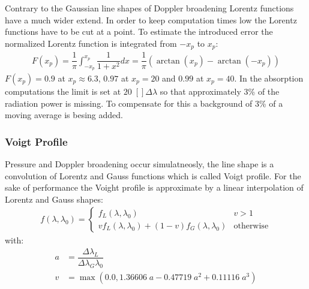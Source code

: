 Contrary to the Gaussian line shapes of Doppler broadening Lorentz functions have a much wider extend. In order to keep computation times low the Lorentz functions have to be cut at a point. To estimate the introduced error the normalized Lorentz function is integrated from $-x_p$ to $x_p$:
\begin{align}
	F(x_p) = \dfrac{1}{\pi} \int_{-x_p}^{x_p} \dfrac{1}{1 + x^2} dx = \dfrac{1}{\pi} \left(\arctan(x_p) - \arctan(-x_p)\right)
\end{align}
$F(x_p) = 0.9$ at $x_p \approx 6.3$, $0.97$ at $x_p = 20$ and $0.99$ at $x_p = 40$. In the absorption computations the limit is set at  $20\;[] \Delta \lambda$ so that approximately 3\% of the radiation power is missing. To compensate for this a background of 3\% of a moving average is besing added.

\subsubsection{Voigt Profile}

Pressure and Doppler broadening occur simulatneosly, the line shape is a convolution of Lorentz and Gauss functions which is called Voigt profile. For the sake of performance the Voight profile is approximate by a linear interpolation of Lorentz and Gauss shapes:
\begin{align}
	f(\lambda, \lambda_0) =
	\begin{cases}
		f_L(\lambda, \lambda_0) & v > 1\\
		v f_L(\lambda, \lambda_0) + (1-v) f_G(\lambda, \lambda_0) & \text{otherwise}
	\end{cases}
\end{align}
with:
\begin{align*}
	a &= \dfrac{\Delta \lambda_L}{\Delta \lambda_G \lambda_0} \\
	v &= \operatorname{max}(0.0, 1.36606 \; a - 0.47719 \; a^2 + 0.11116 \;  a^3)
\end{align*}




